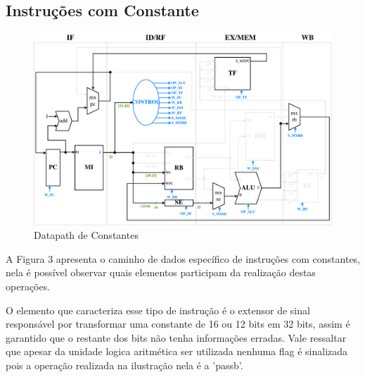 \documentclass{report}
\begin{document}
\subsection{Instruções com Constante}
\begin{figure}[H]
\centering
\includegraphics[width=\textwidth]{./pictures/DatapathCONS.pdf}
\caption{Datapath de Constantes}
\end{figure}
A Figura 3 apresenta o caminho de dados específico de instruções com constantes, nela é possível observar quais elementos participam da realização destas operações.\newline

O elemento que caracteriza esse tipo de instrução é o extensor de sinal responsável por transformar uma constante de 16 ou 12 bits em 32 bits, assim é garantido que o restante dos bits não tenha informações erradas. Vale ressaltar que apesar da unidade logica aritmética ser utilizada nenhuma flag é sinalizada pois a operação realizada na ilustração nela é a 'passb'.
\end{document}
